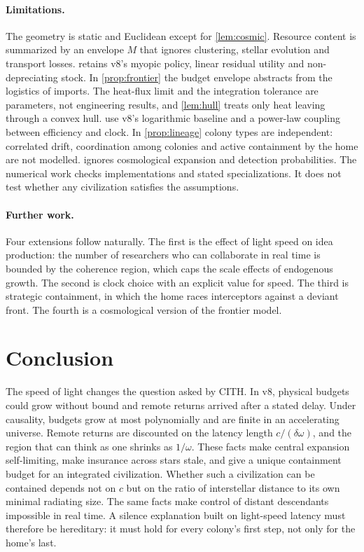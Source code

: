 \documentclass[11pt,a4paper]{article}
\theoremstyle{definition}
\newcommand{\CITH}{\textsc{CITH}}
\begin{document}
\paragraph{Limitations.}
The geometry is static and Euclidean except for \cref{lem:cosmic}. Resource
content is summarized by an envelope $M$ that ignores clustering, stellar
evolution and transport losses.  retains v8's myopic
policy, linear residual utility and non-depreciating stock. In
\cref{prop:frontier} the budget envelope abstracts from the logistics of
imports. The heat-flux limit and the integration tolerance are parameters,
not engineering results, and \cref{lem:hull} treats only heat leaving through
a convex hull.  use v8's logarithmic baseline
and a power-law coupling between efficiency and clock. In
\cref{prop:lineage} colony types are independent: correlated drift,
coordination among colonies and active containment by the home are not
modelled.  ignores cosmological expansion and detection
probabilities. The numerical work checks implementations and stated
specializations. It does not test whether any civilization satisfies the
assumptions.

\paragraph{Further work.}
Four extensions follow naturally. The first is the effect of light speed on
idea production: the number of researchers who can collaborate in real time
is bounded by the coherence region, which caps the scale effects of
endogenous growth. The second is clock choice with an explicit value for
speed. The third is strategic containment, in which the home races
interceptors against a deviant front. The fourth is a cosmological version
of the frontier model.

\section{Conclusion}
\label{sec:conclusion}
The speed of light changes the question asked by \CITH. In v8, physical
budgets could grow without bound and remote returns arrived after a stated
delay. Under causality, budgets grow at most polynomially and are finite in an
accelerating universe. Remote returns are discounted on the latency length
$c/(\delta\omega)$, and the region that can think as one shrinks as $1/\omega$.
These facts make central expansion self-limiting, make insurance across stars
stale, and give a unique containment budget for an integrated civilization.
Whether such a civilization can be contained depends not on $c$ but on the
ratio of interstellar distance to its own minimal radiating size. The same
facts make control of distant descendants impossible in real time. A silence
explanation built on light-speed latency must therefore be hereditary: it
must hold for every colony's first step, not only for the home's last.
\end{document}

